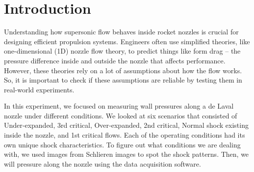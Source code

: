 \chapter{Introduction}
\label{cp:introduction}
Understanding how supersonic flow behaves inside rocket nozzles is crucial for designing efficient propulsion systems. Engineers often use simplified theories, like one-dimensional (1D) nozzle flow theory, to predict things like form drag – the pressure difference inside and outside the nozzle that affects performance. However, these theories rely on a lot of assumptions about how the flow works. So, it is important to check if these assumptions are reliable by testing them in real-world experiments.

In this experiment, we focused on measuring wall pressures along a de Laval nozzle under different conditions. We looked at six scenarios that consisted of Under‐expanded, 3rd critical, Over‐expanded, 2nd critical, Normal shock existing inside the nozzle, and 1st critical flows. Each of the operating conditions had its own unique shock characteristics. To figure out what conditions we are dealing with, we used images from Schlieren images to spot the shock patterns. Then, we will pressure along the nozzle using the data acquisition software. 




